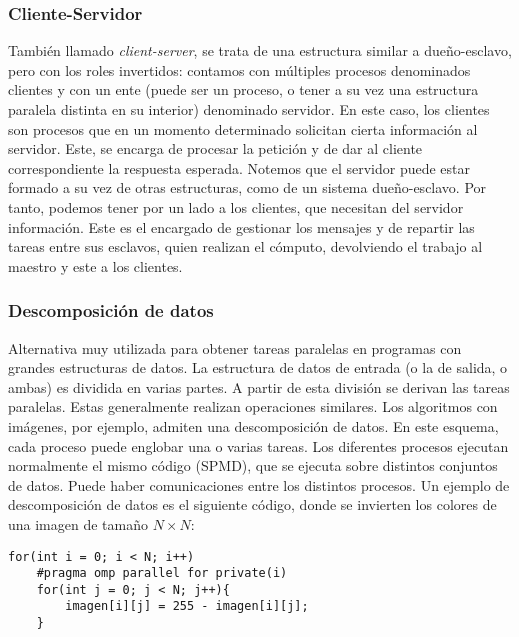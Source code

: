 \subsubsection{Cliente-Servidor} 
También llamado \emph{client-server}, se trata de una estructura similar a dueño-esclavo, pero con los roles invertidos: contamos con múltiples procesos denominados clientes y con un ente (puede ser un proceso, o tener a su vez una estructura paralela distinta en su interior) denominado servidor. En este caso, los clientes son procesos que en un momento determinado solicitan cierta información al servidor. Este, se encarga de procesar la petición y de dar al cliente correspondiente la respuesta esperada. 
Notemos que el servidor puede estar formado a su vez de otras estructuras, como de un sistema dueño-esclavo. Por tanto, podemos tener por un lado a los clientes, que necesitan del servidor información. Este es el encargado de gestionar los mensajes y de repartir las tareas entre sus esclavos, quien realizan el cómputo, devolviendo el trabajo al maestro y este a los clientes. 

\subsubsection{Descomposición de datos} 
Alternativa muy utilizada para obtener tareas paralelas en programas con grandes estructuras de datos. La estructura de datos de entrada (o la de salida, o ambas) es dividida en varias partes. A partir de esta división se derivan las tareas paralelas. Estas generalmente realizan operaciones similares. Los algoritmos con imágenes, por ejemplo, admiten una descomposición de datos.
En este esquema, cada proceso puede englobar una o varias tareas. Los diferentes procesos ejecutan normalmente el mismo código (SPMD), que se ejecuta sobre distintos conjuntos de datos. Puede haber comunicaciones entre los distintos procesos.
Un ejemplo de descomposición de datos es el siguiente código, donde se invierten los colores de una imagen de tamaño $N\times N$:
    \begin{verbatim}
for(int i = 0; i < N; i++)
    #pragma omp parallel for private(i)
    for(int j = 0; j < N; j++){
        imagen[i][j] = 255 - imagen[i][j];
    }
    \end{verbatim}

